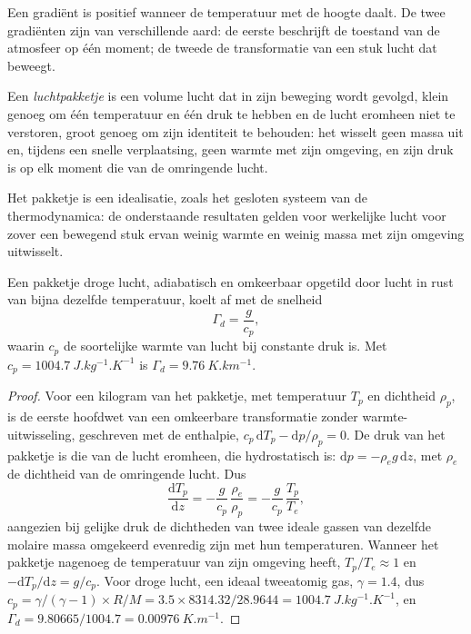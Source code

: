 Een gradiënt is positief wanneer de temperatuur met de hoogte daalt. De twee gradiënten zijn van verschillende aard: de eerste beschrijft de toestand van de atmosfeer op één moment; de tweede de transformatie van een stuk lucht dat beweegt.

\begin{definition}[Luchtpakketje]\label{def:b1:fluid-envelopes-structure:parcel}
Een \emph{luchtpakketje} is een volume lucht dat in zijn beweging wordt gevolgd, klein genoeg om één temperatuur en één druk te hebben en de lucht eromheen niet te verstoren, groot genoeg om zijn identiteit te behouden: het wisselt geen massa uit en, tijdens een snelle verplaatsing, geen warmte met zijn omgeving, en zijn druk is op elk moment die van de omringende lucht.
\end{definition}

Het pakketje is een idealisatie, zoals het gesloten systeem van de thermodynamica: de onderstaande resultaten gelden voor werkelijke lucht voor zover een bewegend stuk ervan weinig warmte en weinig massa met zijn omgeving uitwisselt.

\begin{theorem}\label{thm:b1:fluid-envelopes-structure:dry-adiabatic}
Een pakketje droge lucht, adiabatisch en omkeerbaar opgetild door lucht in rust van bijna dezelfde temperatuur, koelt af met de snelheid
\[
  \Gamma_d = \frac{g}{c_p},
\]
waarin $c_p$ de soortelijke warmte van lucht bij constante druk is. Met $c_p =
\qty{1004.7}{J.kg^{-1}.K^{-1}}$ is $\Gamma_d = \qty{9.76}{K.km^{-1}}$.
\end{theorem}

\begin{proof}
Voor een kilogram van het pakketje, met temperatuur $T_p$ en dichtheid $\rho_p$, is de eerste hoofdwet van een omkeerbare transformatie zonder warmte-uitwisseling, geschreven met de enthalpie, $c_p\,\mathrm dT_p - \mathrm dp/\rho_p = 0$. De druk van het pakketje is die van de lucht eromheen, die hydrostatisch is: $\mathrm dp = -\rho_e
g\,\mathrm dz$, met $\rho_e$ de dichtheid van de omringende lucht. Dus
\[
  \frac{\mathrm dT_p}{\mathrm dz} = -\frac{g}{c_p}\,\frac{\rho_e}{\rho_p}
  = -\frac{g}{c_p}\,\frac{T_p}{T_e},
\]
aangezien bij gelijke druk de dichtheden van twee ideale gassen van dezelfde molaire massa omgekeerd evenredig zijn met hun temperaturen. Wanneer het pakketje nagenoeg de temperatuur van zijn omgeving heeft, $T_p/T_e \approx 1$ en $-\mathrm dT_p/\mathrm dz
= g/c_p$. Voor droge lucht, een ideaal tweeatomig gas, $\gamma = 1.4$, dus $c_p =
\gamma/(\gamma - 1) \times R/M = 3.5 \times 8314.32/28.9644 =
\qty{1004.7}{J.kg^{-1}.K^{-1}}$, en $\Gamma_d = 9.80665/1004.7 =
\qty{0.00976}{K.m^{-1}}$.
\end{proof}

